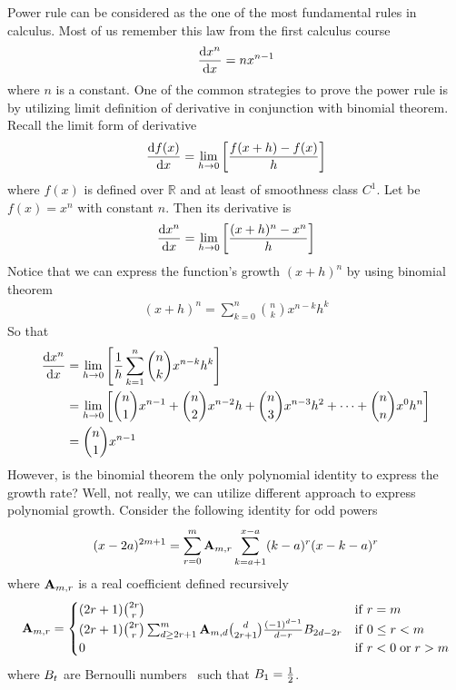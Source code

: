 Power rule can be considered as the one of the most fundamental rules in calculus.
Most of us remember this law from the first calculus course
\begin{align*}
    \odv{x^n}{x} = nx^{n-1}
\end{align*}
where $n$ is a constant.
One of the common strategies to prove the power rule is by utilizing limit definition
of derivative in conjunction with binomial theorem.
Recall the limit form of derivative
\begin{align*}
    \odv{f(x)}{x} = \lim_{h \to 0} \left[ \frac{f(x+h) - f(x)}{h} \right]
\end{align*}
where $f(x)$ is defined over $\mathbb{R}$ and at least of smoothness class $C^1$.
Let be $f(x) = x^n$ with constant $n$.
Then its derivative is
\begin{align*}
    \odv{x^n}{x} = \lim_{h \to 0} \left[ \frac{(x+h)^n - x^n}{h} \right]
\end{align*}
Notice that we can express the function's growth $(x+h)^n$ by using binomial theorem
\begin{align*}
(x+h)
    ^n = \sum_{k=0}^{n} \binom{n}{k} x^{n-k} h^k
\end{align*}
So that
\begin{align*}
    \odv{x^n}{x} &= \lim_{h \to 0} \left[ \frac{1}{h} \sum_{k=1}^{n} \binom{n}{k} x^{n-k} h^k \right] \\
    &= \lim_{h \to 0} \left[ \binom{n}{1} x^{n-1} +  \binom{n}{2} x^{n-2} h
    + \binom{n}{3} x^{n-3} h^2 + \dots + \binom{n}{n} x^{0} h^n \right] \\
    &= \binom{n}{1} x^{n-1}
\end{align*}
However, is the binomial theorem the only polynomial identity to express the growth rate?
Well, not really, we can utilize different approach to express polynomial growth.
Consider the following identity for odd powers~\cite{kolosov2024history, kolosov2016link, kolosov2022106, kolosov2023polynomial}
\begin{align*}
(x-2a)
    ^{2m+1} = \sum_{r=0}^{m} {\mathbf{A}} \sb{m,r} \sum_{k=a+1}^{x-a} (k-a)^r (x-k-a)^r
\end{align*}
where ${\mathbf{A}} \sb{m,r}$ is a real coefficient defined recursively
\begin{equation}
    \label{eq:definition_coefficient_a}
    {\mathbf{A}} \sb{m,r} =
    \begin{cases}
    (2r+1)
        \binom{2r}{r} & \mathrm{if} \; r=m \\
        (2r+1) \binom{2r}{r} \sum_{d \geq 2r+1}^{m} {\mathbf{A}} \sb{m,d} \binom{d}{2r+1} \frac{(-1)^{d-1}}{d-r}
        {B}\sb{2d-2r} & \mathrm{if} \; 0 \leq r<m \\
        0 & \mathrm{if} \; r<0 \; \mathrm{or} \; r>m
    \end{cases}
\end{equation}
where ${B}\sb{t}$ are Bernoulli numbers~\cite{bateman1953higher} such that ${B}\sb{1}=\frac{1}{2}$.
